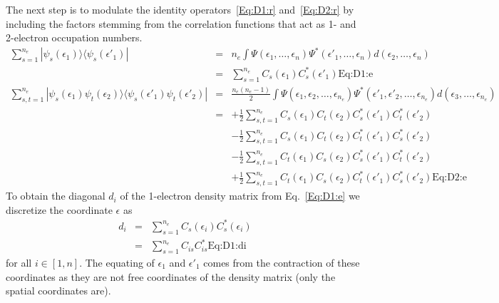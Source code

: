 \documentclass[pra,nofootinbib]{revtex4-1}
\newcommand{\nel}{{n_{e}}}
\newcommand{\dlabel}[1]{\text{#1}\label{#1}}
\begin{document}
The next step is to modulate the identity operators~\ref{Eq:D1:r} and~\ref{Eq:D2:r} by including the
factors stemming from the correlation functions that act as 1- and 2-electron occupation numbers.
\begin{eqnarray}
  \sum_{s=1}^\nel |\psi_s(\epsilon_1)\rangle \langle\psi_s(\epsilon'_1)|
  &=& \nel\int\Psi(\epsilon_1,\ldots,\epsilon_n)\Psi^*(\epsilon'_1,\ldots,\epsilon_n)
      d(\epsilon_2,\ldots,\epsilon_n) \\
  &=& \sum_{s=1}^\nel C_s(\epsilon_1) C_s^*(\epsilon'_1) \dlabel{Eq:D1:e} \\
  \sum_{s,t=1}^\nel |\psi_s(\epsilon_1)\psi_t(\epsilon_2)\rangle \langle\psi_s(\epsilon'_1)\psi_t(\epsilon'_2)| 
  &=& \frac{\nel(\nel-1)}{2}\int\Psi(\epsilon_1,\epsilon_2,\ldots,\epsilon_\nel)
      \Psi^*(\epsilon'_1,\epsilon'_2,\ldots,\epsilon_\nel) d(\epsilon_3,\ldots,\epsilon_\nel) \\
  &=&+\frac{1}{2}\sum_{s,t=1}^{\nel} C_s(\epsilon_1)C_t(\epsilon_2)
                                     C_s^*(\epsilon'_1)C_t^*(\epsilon'_2) \nonumber \\
  &&- \frac{1}{2}\sum_{s,t=1}^{\nel} C_s(\epsilon_1)C_t(\epsilon_2)
                                     C_t^*(\epsilon'_1)C_s^*(\epsilon'_2) \nonumber \\
  &&- \frac{1}{2}\sum_{s,t=1}^{\nel} C_t(\epsilon_1)C_s(\epsilon_2)
                                     C_s^*(\epsilon'_1)C_t^*(\epsilon'_2) \nonumber \\
  &&+ \frac{1}{2}\sum_{s,t=1}^{\nel} C_t(\epsilon_1)C_s(\epsilon_2)
                                     C_t^*(\epsilon'_1)C_s^*(\epsilon'_2) \dlabel{Eq:D2:e}
\end{eqnarray}
To obtain the diagonal $d_i$ of the 1-electron density matrix from Eq.~\ref{Eq:D1:e} we discretize
the coordinate $\epsilon$ as
\begin{eqnarray}
   d_i &=& \sum_{s=1}^\nel C_s(\epsilon_i) C_s^*(\epsilon_i) \\
       &=& \sum_{s=1}^\nel C_{is}C^*_{is} \dlabel{Eq:D1:di}
\end{eqnarray}
for all $i \in [1,n]$. The equating of $\epsilon_1$ and $\epsilon'_1$ comes from the contraction
of these coordinates as they are not free coordinates of the density matrix (only the spatial
coordinates are).
\end{document}
